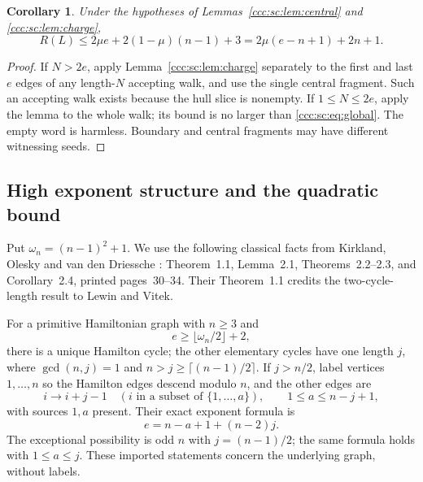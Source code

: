 \documentclass[11pt,letterpaper]{article}
\newtheorem{corollary}[theorem]{Corollary}
\theoremstyle{definition}
\theoremstyle{remark}
\begin{document}
\begin{corollary}\label{ccc:sc:cor:global}
Under the hypotheses of Lemmas~\ref{ccc:sc:lem:central} and \ref{ccc:sc:lem:charge},
\begin{equation}\label{ccc:sc:eq:global}
 R(L)\le2\mu e+2(1-\mu)(n-1)+3
       =2\mu(e-n+1)+2n+1.
\end{equation}
\end{corollary}
\begin{proof}
If $N>2e$, apply Lemma~\ref{ccc:sc:lem:charge} separately to the first and last $e$ edges of any length-$N$ accepting walk, and use the single central fragment. Such an accepting walk exists because the hull slice is nonempty. If $1\le N\le2e$, apply the lemma to the whole walk; its bound is no larger than \eqref{ccc:sc:eq:global}. The empty word is harmless. Boundary and central fragments may have different witnessing seeds.
\end{proof}

\subsection{High exponent structure and the quadratic bound}

Put $\omega_n=(n-1)^2+1$. We use the following classical facts from Kirkland, Olesky and van den Driessche \cite{KOV}: Theorem~1.1, Lemma~2.1, Theorems~2.2--2.3, and Corollary~2.4, printed pages~30--34. Their Theorem~1.1 credits the two-cycle-length result to Lewin and Vitek.

For a primitive Hamiltonian graph with $n\ge3$ and
\begin{equation}\label{ccc:sc:eq:threshold}
 e\ge\lfloor\omega_n/2\rfloor+2,
\end{equation}
there is a unique Hamilton cycle; the other elementary cycles have one length $j$, where $\gcd(n,j)=1$ and $n>j\ge\lceil(n-1)/2\rceil$. If $j>n/2$, label vertices $1,\ldots,n$ so the Hamilton edges descend modulo $n$, and the other edges are
\begin{equation}\label{ccc:sc:eq:chords}
 i\longrightarrow i+j-1\quad(i\text{ in a subset of }\{1,\ldots,a\}),\qquad
 1\le a\le n-j+1,
\end{equation}
with sources $1,a$ present. Their exact exponent formula is
\begin{equation}\label{ccc:sc:eq:exponent}
 e=n-a+1+(n-2)j.
\end{equation}
The exceptional possibility is odd $n$ with $j=(n-1)/2$; the same formula holds with $1\le a\le j$. These imported statements concern the underlying graph, without labels.
\end{document}
